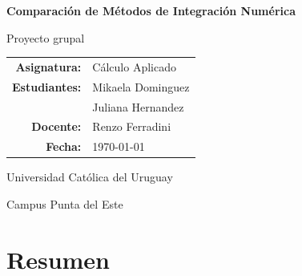 \documentclass[12pt,a4paper]{article}
\begin{document}

\begin{titlepage}
\thispagestyle{empty}

\begin{center}

\vspace*{1.5cm}


\vspace{1.8cm}

{\Huge\textbf{Comparación de Métodos de Integración Numérica}}

\vspace{0.6cm}

{\Large Proyecto grupal}

\vspace{2cm}

\renewcommand{\arraystretch}{1.6}

\begin{tabular}{rl}
\textbf{Asignatura:} & Cálculo Aplicado \\
\textbf{Estudiantes:} & Mikaela Dominguez \\
                      & Juliana Hernandez \\
                
\textbf{Docente:} & Renzo Ferradini\\
\textbf{Fecha:} & \today \\
\end{tabular}

\vfill

{\large Universidad Católica del Uruguay}
\vspace{0.3cm}

{\Large Campus Punta del Este}

\end{center}

\end{titlepage}



\section*{Resumen}
\end{document}
